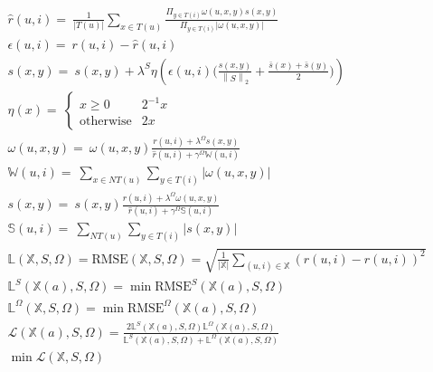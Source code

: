 \begin{gather}
\hat{r}(u,i)=~ \frac{1}{|T(u)|}\sum_{x \in T(u)}\frac{\Pi_{y \in T(i)} \omega(u,x,y)s(x,y)}{\Pi_{y \in T(i)}|\omega(u,x,y)|} \label{eq:s3_estimate} \\
\epsilon(u,i) =~ r(u,i) - \hat{r}(u,i) \nonumber \\
s(x,y)=~ s(x,y)+\lambda^{S}
\eta \left(\epsilon(u,i)
\Big(\frac{s(x,y)}{\left\lVert S \right\rVert_{2}}
+\frac{\bar{s}(x)+\bar{s}(y)}{2}
\Big) \right) \label{eq:s3_scores_feeback} \\
\eta(x)=~ \begin{cases}
x \geq 0 &  2^{-1}x \\
\text{otherwise} &  2x
\end{cases} \nonumber \\
\omega(u,x,y)=~ \omega(u,x,y)
\frac{r(u,i)+\lambda^{\Omega} s(x,y)}
{\hat{r}(u,i)+\gamma^{\Omega}\mathbb{W}(u,i)} \nonumber \\
\mathbb{W}(u,i)=~ \sum_{x\in NT(u)}\sum_{y \in T(i)} |\omega(u,x,y)| \nonumber \\
s(x,y)=~ s(x,y)\frac
{r(u,i)+\lambda^{\Omega}\omega(u,x,y)}
{\hat{r}(u,i) +\gamma^{\Omega}\mathbb{S}(u,i)} \nonumber \\
\mathbb{S}(u,i)=~ \sum_{NT(u)}\sum_{y \in T(i)} |s(x,y)| \nonumber  \\
\mathbb{L}(\mathbb{X}, S, \Omega)=\text{RMSE}(\mathbb{X}, S, \Omega)=
\sqrt{\frac{1}{|\mathbb{X}|}\sum_{(u,i) \in \mathbb{X}} \left(r(u,i) - \hat{r}(u,i) \right)^{2}}
\label{eq:s3_loss} \\
\mathbb{L}^{S}(\mathbb{X}(a), S, \Omega) = \min \text{RMSE}^{S}(\mathbb{X}(a), S, \Omega) \nonumber \\
\mathbb{L}^{\Omega}(\mathbb{X}, S, \Omega) = \min \text{RMSE}^{\Omega}(\mathbb{X}(a), S, \Omega) \nonumber \\
\mathcal{L}(\mathbb{X}(a), S, \Omega) = \frac{2 \mathbb{L}^{S}(\mathbb{X}(a), S, \Omega)\mathbb{L}^{\Omega}(\mathbb{X}(a), S, \Omega)}{\mathbb{L}^{S}(\mathbb{X}(a), S, \Omega)+\mathbb{L}^{\Omega}(\mathbb{X}(a), S, \Omega)}\label{eq:harmonic_loss} \\
\min \mathcal{L}(\mathbb{X}, S, \Omega) \nonumber
\end{gather}

